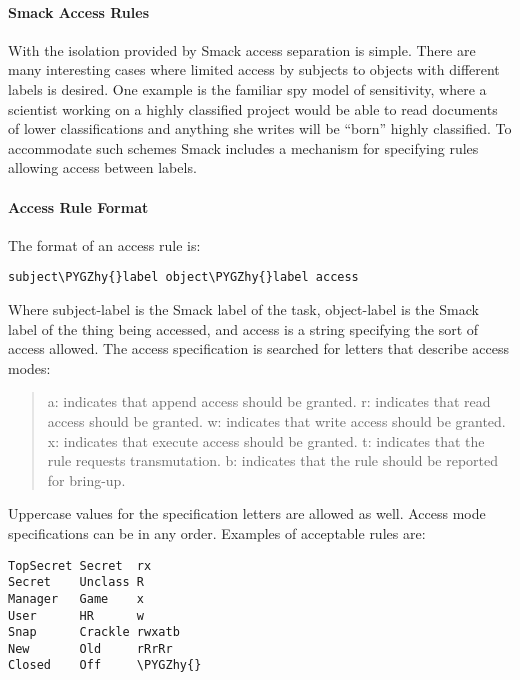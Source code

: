 \documentclass[a4paper,8pt,english]{sphinxmanual}
\def\PYGZhy{\char`\-}
\begin{document}
\paragraph{Smack Access Rules}
\label{admin-guide/LSM/Smack:smack-access-rules}
With the isolation provided by Smack access separation is simple. There are
many interesting cases where limited access by subjects to objects with
different labels is desired. One example is the familiar spy model of
sensitivity, where a scientist working on a highly classified project would be
able to read documents of lower classifications and anything she writes will
be ``born'' highly classified. To accommodate such schemes Smack includes a
mechanism for specifying rules allowing access between labels.


\paragraph{Access Rule Format}
\label{admin-guide/LSM/Smack:access-rule-format}
The format of an access rule is:

\begin{Verbatim}[commandchars=\\\{\}]
subject\PYGZhy{}label object\PYGZhy{}label access
\end{Verbatim}

Where subject-label is the Smack label of the task, object-label is the Smack
label of the thing being accessed, and access is a string specifying the sort
of access allowed. The access specification is searched for letters that
describe access modes:
\begin{quote}

a: indicates that append access should be granted.
r: indicates that read access should be granted.
w: indicates that write access should be granted.
x: indicates that execute access should be granted.
t: indicates that the rule requests transmutation.
b: indicates that the rule should be reported for bring-up.
\end{quote}

Uppercase values for the specification letters are allowed as well.
Access mode specifications can be in any order. Examples of acceptable rules
are:

\begin{Verbatim}[commandchars=\\\{\}]
TopSecret Secret  rx
Secret    Unclass R
Manager   Game    x
User      HR      w
Snap      Crackle rwxatb
New       Old     rRrRr
Closed    Off     \PYGZhy{}
\end{Verbatim}
\end{document}
